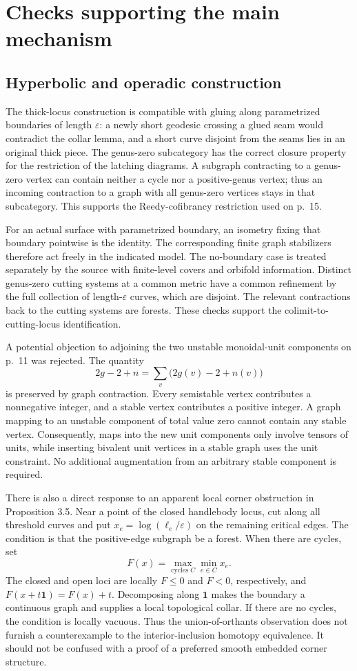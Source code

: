 \documentclass[10pt]{article}
\begin{document}
\section*{Checks supporting the main mechanism}
\subsection*{Hyperbolic and operadic construction}
The thick-locus construction is compatible with gluing along parametrized boundaries of length \(\varepsilon\): a newly short geodesic crossing a glued seam would contradict the collar lemma, and a short curve disjoint from the seams lies in an original thick piece. The genus-zero subcategory has the correct closure property for the restriction of the latching diagrams. A subgraph contracting to a genus-zero vertex can contain neither a cycle nor a positive-genus vertex; thus an incoming contraction to a graph with all genus-zero vertices stays in that subcategory. This supports the Reedy-cofibrancy restriction used on p. 15.\par
For an actual surface with parametrized boundary, an isometry fixing that boundary pointwise is the identity. The corresponding finite graph stabilizers therefore act freely in the indicated model. The no-boundary case is treated separately by the source with finite-level covers and orbifold information. Distinct genus-zero cutting systems at a common metric have a common refinement by the full collection of length-\(\varepsilon\) curves, which are disjoint. The relevant contractions back to the cutting systems are forests. These checks support the colimit-to-cutting-locus identification.\par
A potential objection to adjoining the two unstable monoidal-unit components on p. 11 was rejected. The quantity \[2g-2+n=\sum_v\bigl(2g(v)-2+n(v)\bigr)\] is preserved by graph contraction. Every semistable vertex contributes a nonnegative integer, and a stable vertex contributes a positive integer. A graph mapping to an unstable component of total value zero cannot contain any stable vertex. Consequently, maps into the new unit components only involve tensors of units, while inserting bivalent unit vertices in a stable graph uses the unit constraint. No additional augmentation from an arbitrary stable component is required.\par
There is also a direct response to an apparent local corner obstruction in Proposition 3.5. Near a point of the closed handlebody locus, cut along all threshold curves and put \(x_e=\log(\ell_e/\varepsilon)\) on the remaining critical edges. The condition is that the positive-edge subgraph be a forest. When there are cycles, set \[F(x)=\max_{\text{cycles }C}\min_{e\in C}x_e.\] The closed and open loci are locally \(F\le0\) and \(F<0\), respectively, and \(F(x+t\mathbf1)=F(x)+t\). Decomposing along \(\mathbf1\) makes the boundary a continuous graph and supplies a local topological collar. If there are no cycles, the condition is locally vacuous. Thus the union-of-orthants observation does not furnish a counterexample to the interior-inclusion homotopy equivalence. It should not be confused with a proof of a preferred smooth embedded corner structure.\par
\end{document}
